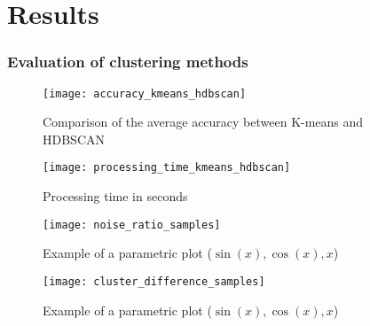 \section{Results}

\subsubsection{Evaluation of clustering methods}


\begin{figure}[h]
    \centering
    \texttt{[image: accuracy\_kmeans\_hdbscan]}
    \caption{Comparison of the average accuracy between K-means and HDBSCAN}
    \label{fig:accuracy_kmeans_hdbscan}
\end{figure}

\begin{figure}[h]
    \centering
    \texttt{[image: processing\_time\_kmeans\_hdbscan]}
    \caption{Processing time in seconds }
    \label{fig:processing_time_kmeans_hdbscan}
\end{figure}

\begin{figure}[h]
    \centering
    \texttt{[image: noise\_ratio\_samples]}
    \caption{Example of a parametric plot ($\sin (x), \cos(x), x$)}
    \label{fig:noise_ratio_samples}
\end{figure}

\begin{figure}[h]
    \centering
    \texttt{[image: cluster\_difference\_samples]}
    \caption{Example of a parametric plot ($\sin (x), \cos(x), x$)}
    \label{fig:cluster_difference_samples}
\end{figure}